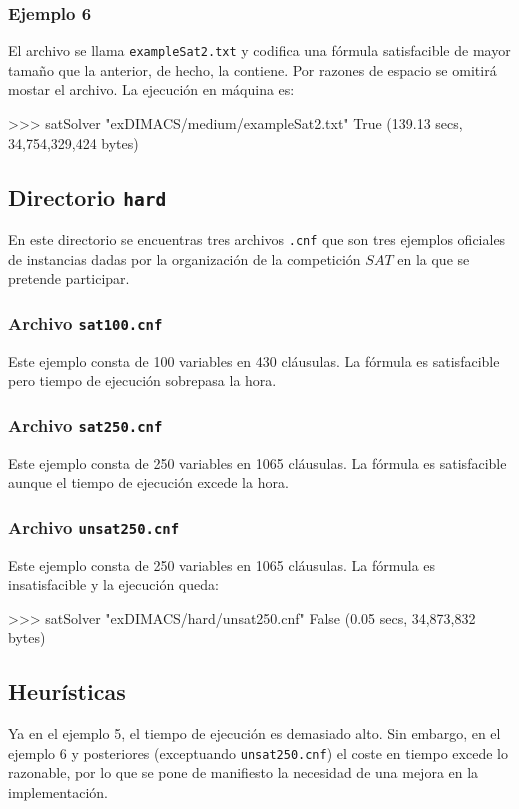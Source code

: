\subsubsection{Ejemplo 6}
El archivo se llama \texttt{exampleSat2.txt} y codifica una fórmula satisfacible de mayor tamaño que la anterior, de hecho, la contiene. Por razones de espacio se omitirá mostar el archivo. La ejecución en máquina es:
\begin{code}
>>> satSolver "exDIMACS/medium/exampleSat2.txt"
True
(139.13 secs, 34,754,329,424 bytes)
\end{code}

\subsection{Directorio \texttt{hard}}

En este directorio se encuentras tres archivos \texttt{.cnf} que son tres ejemplos oficiales de instancias dadas por la organización de la competición $SAT$ en la que se pretende participar.

\subsubsection{Archivo \texttt{sat100.cnf}}
Este ejemplo consta de 100 variables en 430 cláusulas. La fórmula es satisfacible pero tiempo de ejecución sobrepasa la hora.
\subsubsection{Archivo \texttt{sat250.cnf}}
Este ejemplo consta de 250 variables en 1065 cláusulas. La fórmula es satisfacible aunque el tiempo de ejecución excede la hora.
\subsubsection{Archivo \texttt{unsat250.cnf}}
Este ejemplo consta de 250 variables en 1065 cláusulas. La fórmula es insatisfacible y la ejecución queda:
\begin{code}
>>> satSolver "exDIMACS/hard/unsat250.cnf"
False
(0.05 secs, 34,873,832 bytes)
\end{code}

\subsection{Heurísticas}
Ya en el ejemplo 5, el tiempo de ejecución es demasiado alto. Sin embargo, en el ejemplo 6 y posteriores (exceptuando \texttt{unsat250.cnf}) el coste en tiempo excede lo razonable, por lo que se pone de manifiesto la necesidad de una mejora en la implementación.\\

